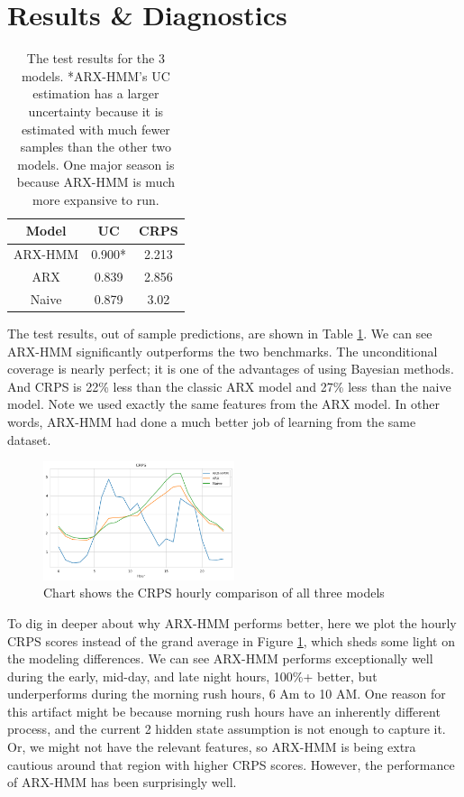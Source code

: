 \documentclass[11pt, letterpaper, journal]{IEEEtran}
\begin{document}
\section{Results \& Diagnostics}
\begin{table}
\begin{center}
\begin{tabular}{||c | c c||} 
    \hline
    Model & UC & CRPS \\ [0.5ex] 
    \hline\hline
    ARX-HMM & 0.900* & 2.213 \\
    \hline
    ARX & 0.839 & 2.856 \\
    \hline
    Naive & 0.879 & 3.02 \\
    \hline
\end{tabular}
\caption{The test results for the 3 models. *ARX-HMM's UC estimation has a larger uncertainty because it is estimated with much fewer samples than the other two models. One major season is because ARX-HMM is much more expansive to run.}
\label{tab:test_results}
\end{center}
\end{table}

The test results, out of sample predictions, are shown in Table \ref{tab:test_results}. We can see ARX-HMM significantly outperforms the two benchmarks. The unconditional coverage is nearly perfect; it is one of the advantages of using Bayesian methods. And CRPS is 22\% less than the classic ARX model and 27\% less than the naive model. Note we used exactly the same features from the ARX model. In other words, ARX-HMM had done a much better job of learning from the same dataset.

\begin{figure}[h]
\centering
\includegraphics[width=0.5\textwidth]{5.a.png}
\caption{Chart shows the CRPS hourly comparison of all three models}
\label{fig:CRPS_comp}
\end{figure}

To dig in deeper about why ARX-HMM performs better, here we plot the hourly CRPS scores instead of the grand average in Figure \ref{fig:CRPS_comp}, which sheds some light on the modeling differences. We can see ARX-HMM performs exceptionally well during the early, mid-day, and late night hours, 100\%+ better, but underperforms during the morning rush hours, 6 Am to 10 AM. One reason for this artifact might be because morning rush hours have an inherently different process, and the current 2 hidden state assumption is not enough to capture it. Or, we might not have the relevant features, so ARX-HMM is being extra cautious around that region with higher CRPS scores. However, the performance of ARX-HMM has been surprisingly well.
\end{document}
